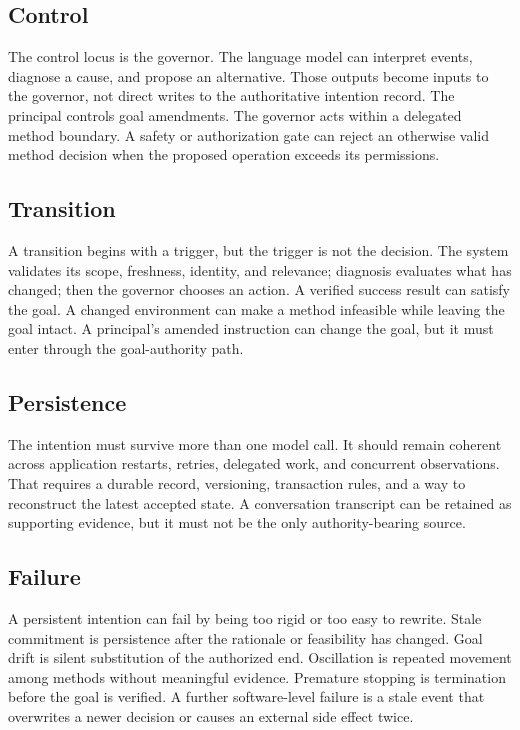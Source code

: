 \subsection{Control}

The control locus is the governor. The language model can interpret events, diagnose a cause, and propose an alternative. Those outputs become inputs to the governor, not direct writes to the authoritative intention record. The principal controls goal amendments. The governor acts within a delegated method boundary. A safety or authorization gate can reject an otherwise valid method decision when the proposed operation exceeds its permissions.

\subsection{Transition}

A transition begins with a trigger, but the trigger is not the decision. The system validates its scope, freshness, identity, and relevance; diagnosis evaluates what has changed; then the governor chooses an action. A verified success result can satisfy the goal. A changed environment can make a method infeasible while leaving the goal intact. A principal's amended instruction can change the goal, but it must enter through the goal-authority path.

\subsection{Persistence}

The intention must survive more than one model call. It should remain coherent across application restarts, retries, delegated work, and concurrent observations. That requires a durable record, versioning, transaction rules, and a way to reconstruct the latest accepted state. A conversation transcript can be retained as supporting evidence, but it must not be the only authority-bearing source.

\subsection{Failure}

A persistent intention can fail by being too rigid or too easy to rewrite. Stale commitment is persistence after the rationale or feasibility has changed. Goal drift is silent substitution of the authorized end. Oscillation is repeated movement among methods without meaningful evidence. Premature stopping is termination before the goal is verified. A further software-level failure is a stale event that overwrites a newer decision or causes an external side effect twice.

